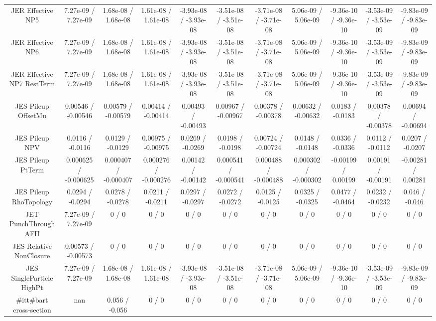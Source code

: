 \begin{table}[htbp]
\begin{center}
\begin{tabular}{|c|c|c|c|c|c|c|c|c|c|c|}
  JER Effective NP5 & 7.27e-09 / 7.27e-09 & 1.68e-08 / 1.68e-08 & 1.61e-08 / 1.61e-08 & -3.93e-08 / -3.93e-08 & -3.51e-08 / -3.51e-08 & -3.71e-08 / -3.71e-08 & 5.06e-09 / 5.06e-09 & -9.36e-10 / -9.36e-10 & -3.53e-09 / -3.53e-09 & -9.83e-09 / -9.83e-09 \\ 
  JER Effective NP6 & 7.27e-09 / 7.27e-09 & 1.68e-08 / 1.68e-08 & 1.61e-08 / 1.61e-08 & -3.93e-08 / -3.93e-08 & -3.51e-08 / -3.51e-08 & -3.71e-08 / -3.71e-08 & 5.06e-09 / 5.06e-09 & -9.36e-10 / -9.36e-10 & -3.53e-09 / -3.53e-09 & -9.83e-09 / -9.83e-09 \\ 
  JER Effective NP7 RestTerm & 7.27e-09 / 7.27e-09 & 1.68e-08 / 1.68e-08 & 1.61e-08 / 1.61e-08 & -3.93e-08 / -3.93e-08 & -3.51e-08 / -3.51e-08 & -3.71e-08 / -3.71e-08 & 5.06e-09 / 5.06e-09 & -9.36e-10 / -9.36e-10 & -3.53e-09 / -3.53e-09 & -9.83e-09 / -9.83e-09 \\ 
  JES Pileup OffsetMu & 0.00546 / -0.00546 & 0.00579 / -0.00579 & 0.00414 / -0.00414 & 0.00493 / -0.00493 & 0.00967 / -0.00967 & 0.00378 / -0.00378 & 0.00632 / -0.00632 & 0.0183 / -0.0183 & 0.00378 / -0.00378 & 0.00694 / -0.00694 \\ 
  JES Pileup NPV & 0.0116 / -0.0116 & 0.0129 / -0.0129 & 0.00975 / -0.00975 & 0.0269 / -0.0269 & 0.0198 / -0.0198 & 0.00724 / -0.00724 & 0.0148 / -0.0148 & 0.0336 / -0.0336 & 0.0112 / -0.0112 & 0.0207 / -0.0207 \\ 
  JES Pileup PtTerm & 0.000625 / -0.000625 & 0.000407 / -0.000407 & 0.000276 / -0.000276 & 0.00142 / -0.00142 & 0.000541 / -0.000541 & 0.000488 / -0.000488 & 0.000302 / -0.000302 & -0.00199 / 0.00199 & 0.00191 / -0.00191 & -0.00281 / 0.00281 \\ 
  JES Pileup RhoTopology & 0.0294 / -0.0294 & 0.0278 / -0.0278 & 0.0211 / -0.0211 & 0.0297 / -0.0297 & 0.0272 / -0.0272 & 0.0125 / -0.0125 & 0.0325 / -0.0325 & 0.0477 / -0.0464 & 0.0232 / -0.0232 & 0.046 / -0.046 \\ 
  JET PunchThrough AFII & 7.27e-09 / 7.27e-09 & 0 / 0 & 0 / 0 & 0 / 0 & 0 / 0 & 0 / 0 & 0 / 0 & 0 / 0 & 0 / 0 & 0 / 0 \\ 
  JES Relative NonClosure & 0.00573 / -0.00573 & 0 / 0 & 0 / 0 & 0 / 0 & 0 / 0 & 0 / 0 & 0 / 0 & 0 / 0 & 0 / 0 & 0 / 0 \\ 
  JES SingleParticle HighPt & 7.27e-09 / 7.27e-09 & 1.68e-08 / 1.68e-08 & 1.61e-08 / 1.61e-08 & -3.93e-08 / -3.93e-08 & -3.51e-08 / -3.51e-08 & -3.71e-08 / -3.71e-08 & 5.06e-09 / 5.06e-09 & -9.36e-10 / -9.36e-10 & -3.53e-09 / -3.53e-09 & -9.83e-09 / -9.83e-09 \\ 
  #it{t#bar{t}} cross-section &    nan    & 0.056 / -0.056 & 0 / 0 & 0 / 0 & 0 / 0 & 0 / 0 & 0 / 0 & 0 / 0 & 0 / 0 & 0 / 0 \\ 

\end{tabular}
\end{center}
\end{table}
